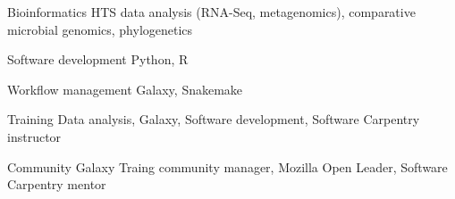 

\begin{cvskills}

  \cvskill
    {Bioinformatics} %
    {HTS data analysis (RNA-Seq, metagenomics), comparative microbial genomics, phylogenetics} %

  \cvskill
    {Software development} %
    {Python, R} %

\cvskill
    {Workflow management} %
    {Galaxy, Snakemake} %
  
  \cvskill
    {Training} %
    {Data analysis, Galaxy, Software development, Software Carpentry instructor} %


  \cvskill
    {Community} %
    {Galaxy Traing community manager, Mozilla Open Leader, Software Carpentry mentor} %


\end{cvskills}
